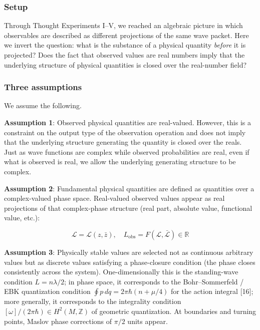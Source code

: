 \documentclass[
]{article}
\begin{document}
\subsubsection{Setup}\label{setup-5}

Through Thought Experiments I--V, we reached an algebraic picture in
which observables are described as different projections of the same
wave packet. Here we invert the question: what is the substance of a
physical quantity \emph{before} it is projected? Does the fact that
observed values are real numbers imply that the underlying structure of
physical quantities is closed over the real-number field?

\subsubsection{Three assumptions}\label{three-assumptions}

We assume the following.

\textbf{Assumption 1}: Observed physical quantities are real-valued.
However, this is a constraint on the output type of the observation
operation and does not imply that the underlying structure generating
the quantity is closed over the reals. Just as wave functions are
complex while observed probabilities are real, even if what is observed
is real, we allow the underlying generating structure to be complex.

\textbf{Assumption 2}: Fundamental physical quantities are defined as
quantities over a complex-valued phase space. Real-valued observed
values appear as real projections of that complex-phase structure (real
part, absolute value, functional value, etc.):

\[
\mathcal{L} = \mathcal{L}(z, \bar{z}), \quad L_{\mathrm{obs}} = F(\mathcal{L}, \bar{\mathcal{L}}) \in \mathbb{R}
\]

\textbf{Assumption 3}: Physically stable values are selected not as
continuous arbitrary values but as discrete values satisfying a
phase-closure condition (the phase closes consistently across the
system). One-dimensionally this is the standing-wave condition
\(L = n\lambda/2\); in phase space, it corresponds to the
Bohr--Sommerfeld / EBK quantization condition
\(\oint p\, dq = 2\pi\hbar(n + \mu/4)\) for the action integral
{[}16{]}; more generally, it corresponds to the integrality condition
\([\omega]/(2\pi\hbar) \in H^2(M, \mathbb{Z})\) of geometric
quantization. At boundaries and turning points, Maslov phase corrections
of \(\pi/2\) units appear.
\end{document}
